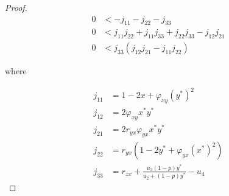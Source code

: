 \begin{proof}
    \begin{align*}
        0 &< -j_{11}-j_{22}-j_{33}\\
        0 &< j_{11}j_{22}+j_{11}j_{33}+j_{22}j_{33}-j_{12}j_{21}\\
        0 &< j_{33}\left(j_{12}j_{21}-j_{11}j_{22}\right)
    \end{align*}

    where
    
    \begin{align*}
        j_{11} &= 1-2x+\varphi_{xy}\left(y^*\right)^2\\
        j_{12} &= 2\varphi_{xy}x^*y^*\\
        j_{21} &= 2r_{yx}\varphi_{yx}x^*y^*\\
        j_{22} &= r_{yx}\left(1-2y^*+\varphi_{yx}\left(x^*\right)^2\right)\\
        j_{33} &= r_{zx}+\frac{u_3\left(1-p\right)y^*}{u_2+\left(1-p\right)y^*}-u_4
    \end{align*}
\end{proof}

